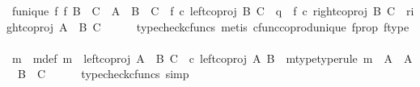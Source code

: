 \begin{isabellebody}
\ f{\isacharunderscore}{\kern0pt}unique{\isacharcolon}{\kern0pt}\ {\isachardoublequoteopen}{\isacharparenleft}{\kern0pt}{\isasymexists}{\isacharbang}{\kern0pt}f{\isachardot}{\kern0pt}\ {\isacharparenleft}{\kern0pt}f{\isacharcolon}{\kern0pt}\ {\isacharparenleft}{\kern0pt}B\ {\isasymCoprod}\ C{\isacharparenright}{\kern0pt}\ {\isasymrightarrow}\ {\isacharparenleft}{\kern0pt}{\isacharparenleft}{\kern0pt}A\ {\isasymCoprod}\ B{\isacharparenright}{\kern0pt}\ {\isasymCoprod}\ C{\isacharparenright}{\kern0pt}{\isacharparenright}{\kern0pt}\ {\isasymand}\ {\isacharparenleft}{\kern0pt}f\ {\isasymcirc}\isactrlsub c\ left{\isacharunderscore}{\kern0pt}coproj\ B\ C\ {\isacharequal}{\kern0pt}\ q{\isacharparenright}{\kern0pt}\ {\isasymand}\ {\isacharparenleft}{\kern0pt}f\ {\isasymcirc}\isactrlsub c\ right{\isacharunderscore}{\kern0pt}coproj\ B\ C\ {\isacharequal}{\kern0pt}\ right{\isacharunderscore}{\kern0pt}coproj\ {\isacharparenleft}{\kern0pt}A\ {\isasymCoprod}\ B{\isacharparenright}{\kern0pt}\ C{\isacharparenright}{\kern0pt}{\isacharparenright}{\kern0pt}{\isachardoublequoteclose}\isanewline
\ \ \ \ \isamarkupfalse%
\ {\isacharparenleft}{\kern0pt}typecheck{\isacharunderscore}{\kern0pt}cfuncs{\isacharcomma}{\kern0pt}\ metis\ cfunc{\isacharunderscore}{\kern0pt}coprod{\isacharunderscore}{\kern0pt}unique\ f{\isacharunderscore}{\kern0pt}prop\ f{\isacharunderscore}{\kern0pt}type{\isacharparenright}{\kern0pt}\isanewline
\isanewline
\ \ \isamarkupfalse%
\ m\ \ m{\isacharunderscore}{\kern0pt}def{\isacharcolon}{\kern0pt}\ {\isachardoublequoteopen}m\ {\isacharequal}{\kern0pt}\ {\isacharparenleft}{\kern0pt}left{\isacharunderscore}{\kern0pt}coproj\ {\isacharparenleft}{\kern0pt}A\ {\isasymCoprod}\ B{\isacharparenright}{\kern0pt}\ C\ {\isacharparenright}{\kern0pt}\ {\isasymcirc}\isactrlsub c\ {\isacharparenleft}{\kern0pt}left{\isacharunderscore}{\kern0pt}coproj\ A\ B{\isacharparenright}{\kern0pt}{\isachardoublequoteclose}\ \ m{\isacharunderscore}{\kern0pt}type{\isacharbrackleft}{\kern0pt}type{\isacharunderscore}{\kern0pt}rule{\isacharbrackright}{\kern0pt}{\isacharcolon}{\kern0pt}\ {\isachardoublequoteopen}m\ {\isacharcolon}{\kern0pt}\ A\ {\isasymrightarrow}\ {\isacharparenleft}{\kern0pt}A\ {\isasymCoprod}\ B{\isacharparenright}{\kern0pt}\ {\isasymCoprod}\ C{\isachardoublequoteclose}\isanewline
\ \ \ \ \isamarkupfalse%
\ {\isacharparenleft}{\kern0pt}typecheck{\isacharunderscore}{\kern0pt}cfuncs{\isacharcomma}{\kern0pt}\ simp{\isacharparenright}{\kern0pt}\isanewline
\ \ \isamarkupfalse%

\end{isabellebody}
